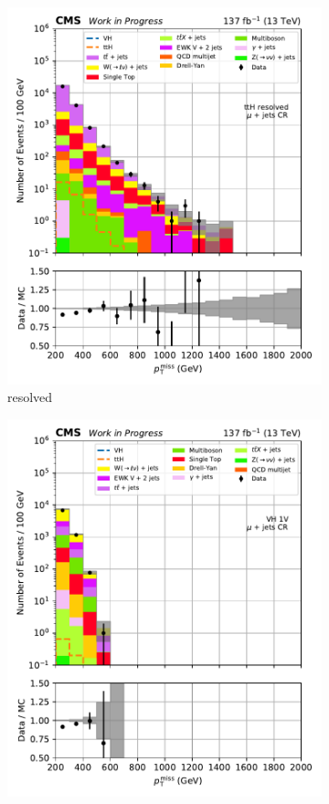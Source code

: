 \begin{figure}[htbp]
\begin{subfigure}[b]{0.24\textwidth}
        \includegraphics[width=\textwidth]{figures/region_plots/2016to18/region_1/ttH_resolved.pdf}
        \caption{\ttH resolved}
    \end{subfigure}
    \hfill
    \begin{subfigure}[b]{0.24\textwidth}
        \includegraphics[width=\textwidth]{figures/region_plots/2016to18/region_1/VH_1V.pdf}

\end{subfigure}
\end{figure}
